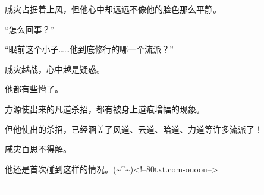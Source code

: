 \begin{this_body}
戚灾占据着上风，但他心中却远远不像他的脸色那么平静。

“怎么回事？”

“眼前这个小子……他到底修行的哪一个流派？”

戚灾越战，心中越是疑惑。

他都有些懵了。

方源使出来的凡道杀招，都有被身上道痕增幅的现象。

但他使出的杀招，已经涵盖了风道、云道、暗道、力道等许多流派了！

戚灾百思不得解。

他还是首次碰到这样的情况。(\~{}\^{}\~{})<!--80txt.com-ouoou-->

------------

\end{this_body}

